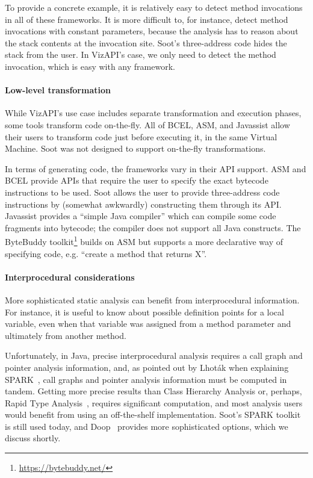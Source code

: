 To provide a concrete example, it is relatively easy to detect method
invocations in all of these frameworks. It is more difficult to, for
instance, detect method invocations with constant parameters, because
the analysis has to reason about the stack contents at the invocation
site. Soot's three-address code hides the stack from the user. In VizAPI's
case, we only need to detect the method invocation, which is easy
with any framework.

\paragraph{Low-level transformation}
While VizAPI's use case includes separate transformation and execution
phases, some tools transform code on-the-fly. All of BCEL, ASM,
and Javassist allow their users to transform code just before executing it,
in the same Virtual Machine. Soot was not designed to support on-the-fly
transformations.

In terms of generating code, the frameworks vary in their API support.
ASM and BCEL provide APIs that require the user to specify the exact
bytecode instructions to be used. Soot allows the user to provide
three-address code instructions by (somewhat awkwardly) constructing
them through its API. Javassist provides a ``simple Java compiler''
which can compile some code fragments into bytecode; the compiler does
not support all Java constructs.  The ByteBuddy
toolkit\footnote{\url{https://bytebuddy.net/}} builds on ASM but
supports a more declarative way of specifying code, e.g. ``create a
method that returns X''.

\paragraph{Interprocedural considerations}
More sophisticated static analysis can benefit from interprocedural
information. For instance, it is useful to know about possible
definition points for a local variable, even when that variable
was assigned from a method parameter and ultimately from another method.

Unfortunately, in Java, precise interprocedural analysis requires a
call graph and pointer analysis information, and, as pointed out by
Lhot\'ak when explaining SPARK~\cite{lhot02}, call graphs and pointer analysis information must be
computed in tandem. Getting more precise results than Class Hierarchy
Analysis or, perhaps, Rapid Type
Analysis~\cite{bacon96:_fast_static_analy_c_virtual_funct_calls},
requires significant computation, and most analysis users would
benefit from using an off-the-shelf implementation. Soot's SPARK
toolkit is still used today, and
Doop~\cite{bravenboer09:_stric_declar_specif_sophis_point_analy}
provides more sophisticated options, which we discuss shortly.

